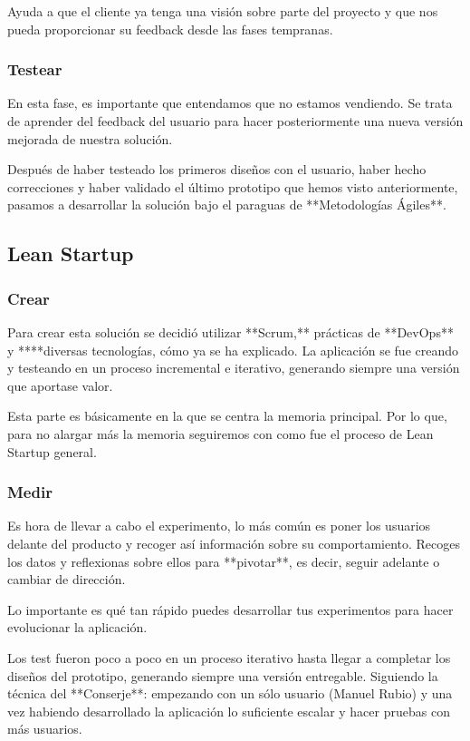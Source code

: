 \documentclass[12pt,twoside,titlepage]{report}
\begin{document}
Ayuda a que el cliente ya tenga una visión sobre parte del proyecto y que nos pueda proporcionar su feedback desde las fases tempranas.

\subsubsection{Testear}

En esta fase, es importante que entendamos que no estamos vendiendo. Se trata de aprender del feedback del usuario para hacer posteriormente una nueva versión mejorada de nuestra solución.

Después de haber testeado los primeros diseños con el usuario, haber hecho correcciones y haber validado el último prototipo que hemos visto anteriormente, pasamos a desarrollar la solución bajo el paraguas de **Metodologías Ágiles**.

\subsection{Lean Startup}

\subsubsection{Crear}

Para crear esta solución se decidió utilizar **Scrum,** prácticas de **DevOps** y ****diversas tecnologías, cómo ya se ha explicado. La aplicación se fue creando y testeando en un proceso incremental e iterativo, generando siempre una versión que aportase valor.

Esta parte es básicamente en la que se centra la memoria principal. Por lo que, para no alargar más la memoria seguiremos con como fue el proceso de Lean Startup general.

\subsubsection{Medir}

Es hora de llevar a cabo el experimento, lo más común es poner los usuarios delante del producto y recoger así información sobre su comportamiento. Recoges los datos y reflexionas sobre ellos para **pivotar**, es decir, seguir adelante o cambiar de dirección. 

Lo importante es qué tan rápido puedes desarrollar tus experimentos para hacer evolucionar la aplicación. 

Los test fueron poco a poco en un proceso iterativo hasta llegar a completar los diseños del prototipo, generando siempre una versión entregable. Siguiendo la técnica del **Conserje**: empezando con un sólo usuario (Manuel Rubio) y una vez habiendo desarrollado la aplicación lo suficiente escalar y hacer pruebas con más usuarios.
\end{document}
